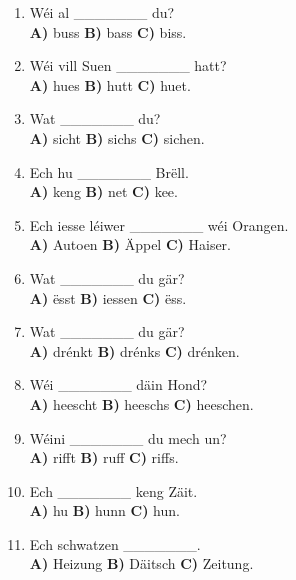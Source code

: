 \begin{enumerate}
    \item Wéi al \_\_\_\_\_\_\_ du? \\
    \textbf{A)} buss \quad \textbf{B)} bass \quad \textbf{C)} biss.
    
    \item Wéi vill Suen \_\_\_\_\_\_\_ hatt? \\
    \textbf{A)} hues \quad \textbf{B)} hutt \quad \textbf{C)} huet.
    
    \item Wat \_\_\_\_\_\_\_ du? \\
    \textbf{A)} sicht \quad \textbf{B)} sichs \quad \textbf{C)} sichen.
    
    \item Ech hu \_\_\_\_\_\_\_ Brëll. \\
    \textbf{A)} keng \quad \textbf{B)} net \quad \textbf{C)} kee.
    
    \item Ech iesse léiwer \_\_\_\_\_\_\_ wéi Orangen. \\
    \textbf{A)} Autoen \quad \textbf{B)} Äppel \quad \textbf{C)} Haiser.
    
    \item Wat \_\_\_\_\_\_\_ du gär? \\
    \textbf{A)} ësst \quad \textbf{B)} iessen \quad \textbf{C)} ëss.
    
    \item Wat \_\_\_\_\_\_\_ du gär? \\
    \textbf{A)} drénkt \quad \textbf{B)} drénks \quad \textbf{C)} drénken.
    
    \item Wéi \_\_\_\_\_\_\_ däin Hond? \\
    \textbf{A)} heescht \quad \textbf{B)} heeschs \quad \textbf{C)} heeschen.
    
    \item Wéini \_\_\_\_\_\_\_ du mech un? \\
    \textbf{A)} rifft \quad \textbf{B)} ruff \quad \textbf{C)} riffs.
    
    \item Ech \_\_\_\_\_\_\_ keng Zäit. \\
    \textbf{A)} hu \quad \textbf{B)} hunn \quad \textbf{C)} hun.
    
    \item Ech schwatzen \_\_\_\_\_\_\_. \\
    \textbf{A)} Heizung \quad \textbf{B)} Däitsch \quad \textbf{C)} Zeitung.
    

\end{enumerate}
